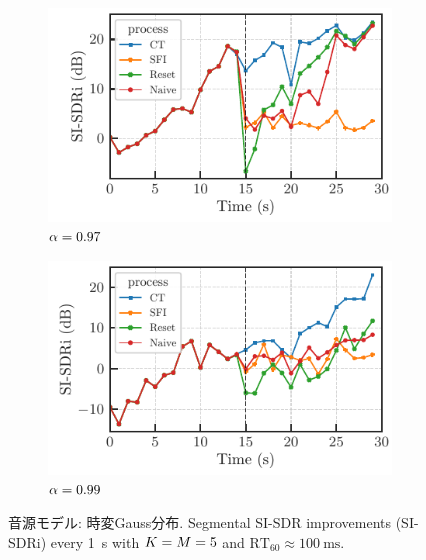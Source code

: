 \documentclass[sip,biber]{now-journal}
\begin{document}
\begin{figure}[t]
  \begin{subfigure}{\columnwidth}
    \centering
    \includegraphics{figures/plots/online/Gauss_8000_97.pdf}
    \caption{$\alpha = 0.97$}%
    \label{fig:plot:batch:gauss:97}
  \end{subfigure}%

  \begin{subfigure}{\columnwidth}
    \centering
    \includegraphics{figures/plots/online/Gauss_8000_99.pdf}
    \caption{$\alpha = 0.99$}%
    \label{fig:plot:batch:gauss:99}
  \end{subfigure}%
  \caption{音源モデル: 時変Gauss分布. Segmental SI-SDR improvements (SI-SDRi) every \SI{1}{\second} with $K = M = 5$ and $\text{RT}_{60} \approx \SI{100}{\milli\second}$.}
\end{figure}
\end{document}
